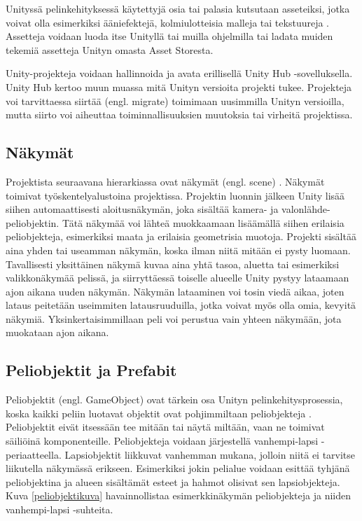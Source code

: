 \documentclass[utf8]{gradu3}
\begin{document}
Unityssä pelinkehityksessä käytettyjä osia tai palasia kutsutaan asseteiksi, jotka voivat olla esimerkiksi ääniefektejä, kolmiulotteisia malleja tai tekstuureja \parencite{unitydocasset}. Assetteja voidaan luoda itse Unityllä tai muilla ohjelmilla tai ladata muiden tekemiä assetteja Unityn omasta Asset Storesta.

Unity-projekteja voidaan hallinnoida ja avata erillisellä Unity Hub -sovelluksella. Unity Hub kertoo muun muassa mitä Unityn versioita projekti tukee. Projekteja voi tarvittaessa siirtää (engl. migrate) toimimaan uusimmilla Unityn versioilla, mutta siirto voi aiheuttaa toiminnallisuuksien muutoksia tai virheitä projektissa.

\subsection{Näkymät}

Projektista seuraavana hierarkiassa ovat näkymät (engl. scene) \parencite{unitydocscene}. Näkymät toimivat työskentelyalustoina projektissa. Projektin luonnin jälkeen Unity lisää siihen automaattisesti aloitusnäkymän, joka sisältää kamera- ja valonlähde-peliobjektin. Tätä näkymää voi lähteä muokkaamaan lisäämällä siihen erilaisia peliobjekteja, esimerkiksi maata ja erilaisia geometrisia muotoja. Projekti sisältää aina yhden tai useamman näkymän, koska ilman niitä mitään ei pysty luomaan. Tavallisesti yksittäinen näkymä kuvaa aina yhtä tasoa, aluetta tai esimerkiksi valikkonäkymää pelissä, ja siirryttäessä toiselle alueelle Unity pystyy lataamaan ajon aikana uuden näkymän. Näkymän lataaminen voi tosin viedä aikaa, joten lataus peitetään useimmiten latausruuduilla, jotka voivat myös olla omia, kevyitä näkymiä. Yksinkertaisimmillaan peli voi perustua vain yhteen näkymään, jota muokataan ajon aikana.

\subsection{Peliobjektit ja Prefabit}

Peliobjektit (engl. GameObject) ovat tärkein osa Unityn pelinkehitysprosessia, koska kaikki peliin luotavat objektit ovat pohjimmiltaan peliobjekteja \parencite{unitydocgameobj}. Peliobjektit eivät itsessään tee mitään tai näytä miltään, vaan ne toimivat säiliöinä komponenteille. Peliobjekteja voidaan järjestellä vanhempi-lapsi -periaatteella. Lapsiobjektit liikkuvat vanhemman mukana, jolloin niitä ei tarvitse liikutella näkymässä erikseen. Esimerkiksi jokin pelialue voidaan esittää tyhjänä peliobjektina ja alueen sisältämät esteet ja hahmot olisivat sen lapsiobjekteja. Kuva \ref{peliobjektikuva} havainnollistaa esimerkkinäkymän peliobjekteja ja niiden vanhempi-lapsi -suhteita.
\end{document}
